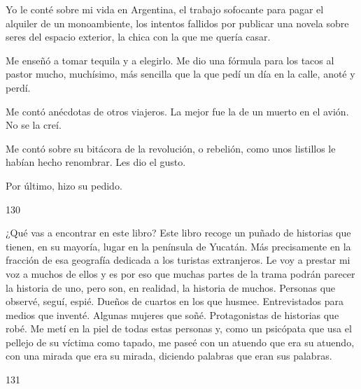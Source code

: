 \documentclass[12pt,twoside,openright,a5paper]{book}
\begin{document}
Yo le conté sobre mi vida en Argentina, el trabajo sofocante para pagar el
alquiler de un monoambiente, los intentos fallidos por publicar una novela
sobre seres del espacio exterior, la chica con la que me quería casar.

Me enseñó a tomar tequila y a elegirlo. Me dio una fórmula para los
tacos al pastor mucho, muchísimo, más sencilla que la que pedí un día
en la calle, anoté y perdí.

Me contó anécdotas de otros viajeros. La mejor fue la de un muerto en el
avión. No se la creí.

Me contó sobre su bitácora de la revolución, o rebelión, como unos
listillos le habían hecho renombrar. Les dio el gusto.

Por último, hizo su pedido.

\vspace{0.5cm}
\afterpage{}
\hrulefill \hspace{0.1cm}\decofourleft\hspace{0.2cm} 130 \hspace{0.2cm}\decofourright \hspace{0.1cm}\hrulefill

\nopagebreak

\vspace{0.5cm}

\nopagebreak

¿Qué vas a encontrar en este libro? Este libro recoge un puñado
de historias que tienen, en su mayoría, lugar en la península de
Yucatán. Más precisamente en la fracción de esa geografía dedicada a
los turistas extranjeros. Le voy a prestar mi voz a muchos de ellos y es
por eso que muchas partes de la trama podrán parecer la historia de uno,
pero son, en realidad, la historia de muchos. Personas que observé, seguí,
espié. Dueños de cuartos en los que husmee. Entrevistados para medios
que inventé. Algunas mujeres que soñé. Protagonistas de historias que
robé. Me metí en la piel de todas estas personas y, como un psicópata
que usa el pellejo de su víctima como tapado, me paseé con un atuendo
que era su atuendo, con una mirada que era su mirada, diciendo palabras
que eran sus palabras.


\vspace{0.5cm}

\hrulefill \hspace{0.1cm}\decofourleft\hspace{0.2cm} 131 \hspace{0.2cm}\decofourright \hspace{0.1cm}\hrulefill
\end{document}
